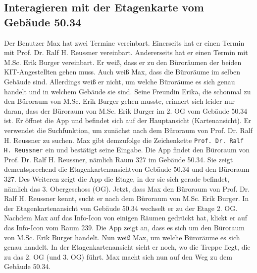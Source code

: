 \subsection{Interagieren mit der Etagenkarte vom Gebäude 50.34}

Der Benutzer Max hat zwei Termine vereinbart.
Einerseits hat er einen Termin mit Prof. Dr. Ralf H. Reussner vereinbart.
Andererseits hat er einen Termin mit M.Sc. Erik Burger vereinbart.
Er weiß, dass er zu den Büroräumen der beiden \Gls{KIT}-Angestellten gehen muss.
Auch weiß Max, dass die Büroräume im selben Gebäude sind.
Allerdings weiß er nicht, um welche Büroräume es sich genau handelt und in welchem Gebäude sie sind.
Seine Freundin Erika, die schonmal zu den Büroraum von M.Sc. Erik Burger gehen musste, erinnert sich leider nur daran, dass der Büroraum von M.Sc. Erik Burger im 2. OG vom Gebäude 50.34 ist.
Er öffnet die App und befindet sich auf der Hauptansicht (\Gls{Kartenansicht}).
Er verwendet die Suchfunktion, um zunächst nach dem Büroraum von Prof. Dr. Ralf H. Reussner zu suchen.
Max gibt demzufolge die \Gls{Zeichenkette} \texttt{Prof. Dr. Ralf H. Reussner} ein und bestätigt seine Eingabe.
Die App findet den Büroraum von Prof. Dr. Ralf H. Reussner, nämlich Raum 327 im Gebäude 50.34.
Sie zeigt dementsprechend die \Gls{Etagenkartenansicht}von Gebäude 50.34 und den Büroraum 327.
Des Weiteren zeigt die App die Etage, in der sie sich gerade befindet, nämlich das 3. Obergeschoss (OG).
Jetzt, dass Max den Büroraum von Prof. Dr. Ralf H. Reussner kennt, sucht er nach dem Büroraum von M.Sc. Erik Burger.
In der \Gls{Etagenkartenansicht} von Gebäude 50.34 wechselt er zu der Etage 2. OG.
Nachdem Max auf das Info-\Gls{Icon} von einigen Räumen gedrückt hat, klickt er auf das Info-\Gls{Icon} vom Raum 239.
Die App zeigt an, dass es sich um den Büroraum von M.Sc. Erik Burger handelt.
Nun weiß Max, um welche Büroräume es sich genau handelt.
In der \Gls{Etagenkartenansicht} sieht er noch, wo die Treppe liegt, die zu das 2. OG (und 3. OG) führt.
Max macht sich nun auf den Weg zu dem Gebäude 50.34.